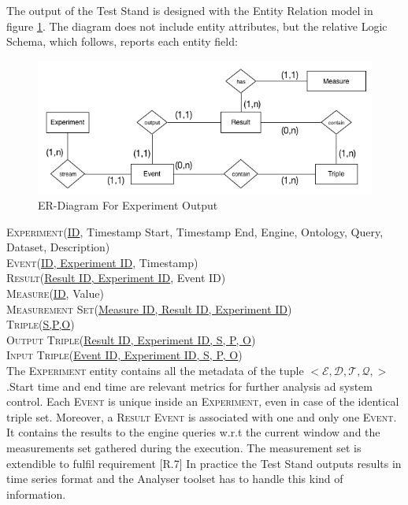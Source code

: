 \noindent The output of the Test Stand is designed with the Entity Relation model in figure \ref{fig:er}. The diagram does not include entity attributes, but the relative Logic Schema, which follows, reports each entity field:\\
\begin{figure}[tbh]
  \centering
	\includegraphics[width=\linewidth]{images/er-db}
	\caption{ER-Diagram For Experiment Output} 
  	\label{fig:er}
\end{figure}

\pagebreak

\noindent\textsc{Experiment}(\underline{ID}, Timestamp Start, Timestamp End, Engine, Ontology, Query, Dataset, Description)\\
\textsc{Event}(\underline{ID, Experiment ID}, Timestamp)\\
\textsc{Result}(\underline{Result ID, Experiment ID}, Event ID)\\
\textsc{Measure}(\underline{ID}, Value)\\
\textsc{Measurement Set}(\underline{Measure ID, Result ID, Experiment ID})\\
\textsc{Triple}(\underline{S,P,O})\\
\textsc{Output Triple}(\underline{Result ID, Experiment ID, S, P, O})\\
\textsc{Input Triple}(\underline{Event ID, Experiment ID, S, P, O})\\

The \textsc{Experiment} entity contains all the metadata of the tuple $<\mathcal{E},\mathcal{D},\mathcal{T},\mathcal{Q},>$.Start time and end time are relevant metrics for further analysis ad system control. Each \textsc{Event} is unique inside an \textsc{Experiment}, even in case of the identical triple set. Moreover, a \textsc{Result Event} is associated with one and only one \textsc{Event}. It contains the results to the engine queries w.r.t the current window and the measurements set gathered during the execution. The measurement set is extendible to fulfil requirement [R.7]
In practice the Test Stand outputs results in time series format and  the Analyser toolset has to handle this kind of information. 

